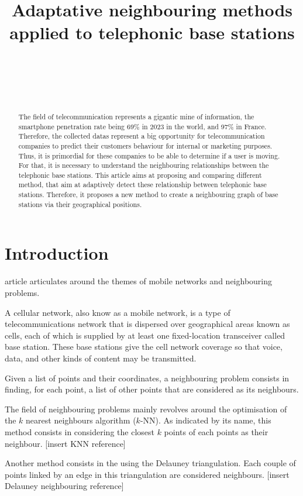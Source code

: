 \documentclass[lettersize,journal,english]{IEEEtran}
\title{Adaptative neighbouring methods applied to telephonic base stations}
\author{\IEEEauthorblockN{Paul MÉHAUD}\\
\IEEEauthorblockA{\textit{Intern at CTU in Prague} \\
\textit{INSA Rouen Normandie}\\
paul.mehaud@insa-rouen.fr}\\
\and
\IEEEauthorblockN{Brendan SÉVELLEC}\\
\IEEEauthorblockA{\textit{Intern at CTU in Prague} \\
\textit{INSA Rouen Normandie}\\
brendan.sevellec@insa-rouen.fr}}
\begin{document}
\maketitle

\begin{abstract}
    The field of telecommunication represents a gigantic mine of information, the smartphone penetration rate being 69\% in 2023 in the world, and 97\% in France. Therefore, the collected datas represent a big opportunity for telecommunication companies to predict their customers behaviour for internal or marketing purposes. Thus, it is primordial for these companies to be able to determine if a user is moving. For that, it is necessary to understand the neighbouring relationships between the telephonic base stations. This article aims at proposing and comparing different method, that aim at adaptively detect these relationship between telephonic base stations. Therefore, it proposes a new method to create a neighbouring graph of base stations via their geographical positions.
\end{abstract}

\section{Introduction}
     article articulates around the themes of mobile networks and neighbouring problems. 

    A cellular network, also know as a mobile network, is a type of telecommunications network that is dispersed over geographical areas known as cells, each of which is supplied by at least one fixed-location transceiver called base station. These base stations give the cell network coverage so that voice, data, and other kinds of content may be transmitted.
    
    Given a list of points and their coordinates, a neighbouring problem consists in finding, for each point, a list of other points that are considered as its neighbours.

    The field of neighbouring problems mainly revolves around the optimisation of the $k$ nearest neighbours algorithm ($k$-NN).
    As indicated by its name, this method consists in considering the closest $k$ points of each points as their neighbour.
    [insert KNN reference]

    Another method consists in the using the Delauney triangulation. Each couple of points linked by an edge in this triangulation are considered neighbours.
    [insert Delauney neighbouring reference]
\end{document}
